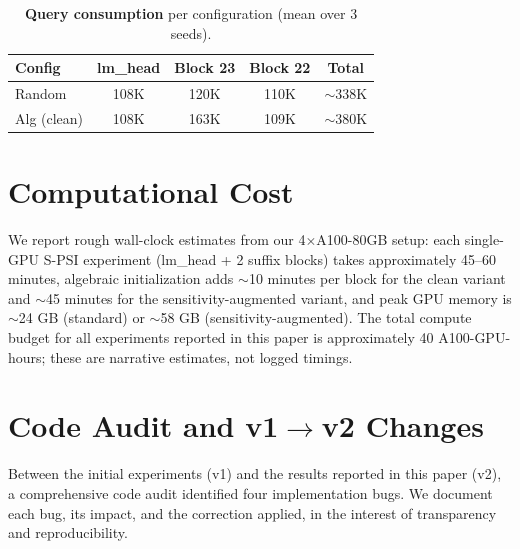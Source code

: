 \documentclass{article}
\begin{document}
\begin{table}[h]
\centering
\caption{\textbf{Query consumption} per configuration (mean over 3 seeds).}
\label{tab:query-budget}
\small
\begin{tabular}{@{}l ccc c@{}}
\toprule
\textbf{Config} & \textbf{lm\_head} & \textbf{Block 23} & \textbf{Block 22} & \textbf{Total} \\
\midrule
Random         & 108K & 120K & 110K & $\sim$338K \\
Alg (clean)    & 108K & 163K & 109K & $\sim$380K \\
\bottomrule
\end{tabular}
\end{table}

\section{Computational Cost}
\label{app:compute}

We report rough wall-clock estimates from our 4$\times$A100-80GB setup: each single-GPU S-PSI experiment (lm\_head + 2 suffix blocks) takes approximately 45--60 minutes, algebraic initialization adds $\sim$10 minutes per block for the clean variant and $\sim$45 minutes for the sensitivity-augmented variant, and peak GPU memory is $\sim$24 GB (standard) or $\sim$58 GB (sensitivity-augmented). The total compute budget for all experiments reported in this paper is approximately 40 A100-GPU-hours; these are narrative estimates, not logged timings.


\section{Code Audit and v1$\to$v2 Changes}
\label{app:forensic}

Between the initial experiments (v1) and the results reported in this paper (v2), a comprehensive code audit identified four implementation bugs.  We document each bug, its impact, and the correction applied, in the interest of transparency and reproducibility.
\end{document}

